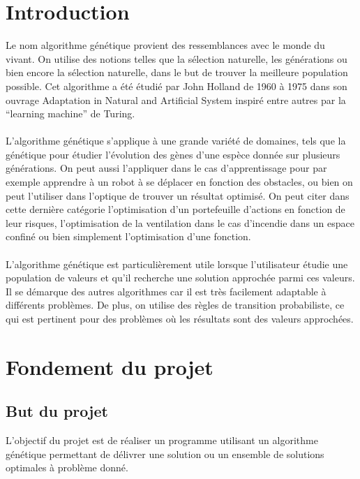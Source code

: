 \documentclass[a4paper,11pt]{article}
\title{\vspace{13em}{\huge Cahier des Charges}}
\author{Edouard Fouassier - Maxime Gonthier - Benjamin Guillot\\
		Laureline Martin - Rémi Navarro - Lydia Rodrigez de la Nava
		\vspace{2em}\\
		Algorithme Génétique
		\vspace{2em}}
\begin{document}
	
	\clearpage
	\maketitle\vspace{13em}
\newpage
\tableofcontents
\newpage\clearpage{}
	
	\section{Introduction}
		Le nom algorithme génétique provient des ressemblances avec le monde du vivant. On utilise des notions telles que la sélection naturelle, les générations ou bien encore la sélection naturelle, dans le but de trouver la meilleure population possible. 
		Cet algorithme a été étudié par John Holland de 1960 à 1975 dans son ouvrage Adaptation in Natural and Artificial System inspiré entre autres par la “learning machine” de Turing.\\
		\\
		L’algorithme génétique s’applique à une grande variété de domaines, tels que la génétique pour étudier l’évolution des gènes d’une espèce donnée sur plusieurs générations. 
		On peut aussi l'appliquer dans le cas d’apprentissage pour par exemple apprendre à un robot à se déplacer en fonction des obstacles, ou bien on peut l'utiliser dans l'optique de trouver un résultat optimisé.
		On peut citer dans cette dernière catégorie l’optimisation d'un portefeuille d'actions en fonction de leur risques, l’optimisation de la ventilation dans le cas d'incendie dans un espace confiné ou bien simplement l’optimisation d’une fonction.\\ 
		\\
		L’algorithme génétique est particulièrement utile lorsque l’utilisateur étudie une population de valeurs et qu’il recherche une solution approchée parmi ces valeurs. 
		Il se démarque des autres algorithmes car il est très facilement adaptable à différents problèmes. 
		De plus, on utilise des règles de transition probabiliste, ce qui est pertinent pour des problèmes où les résultats sont des valeurs approchées.\\

	\section{Fondement du projet}
		\subsection{But du projet}
			L'objectif du projet est de réaliser un programme utilisant un algorithme génétique permettant de délivrer une solution ou un ensemble de solutions optimales à problème donné.
		
\end{document}
